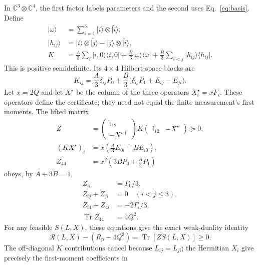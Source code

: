 \documentclass[aps,pra,reprint,amsmath,amssymb,nofootinbib,longbibliography,floatfix]{revtex4-2}
\newcommand{\ket}[1]{\lvert #1\rangle}
\newcommand{\bra}[1]{\langle #1\rvert}
\newcommand{\Tr}{\operatorname{Tr}}
\newcommand{\I}{\mathbb{I}}
\begin{document}
In $\mathbb C^3\otimes\mathbb C^4$, the first factor labels parameters
and the second uses Eq.~\eqref{eq:basis}. Define
\begin{align}
 \ket{\omega}&=\sum_{i=1}^3\ket i\otimes\ket{\widetilde i},\nonumber\\
 \ket{h_{ij}}&=\ket i\otimes\ket{\widetilde j}
                   -\ket j\otimes\ket{\widetilde i},\nonumber\\
 K&=\frac A3\sum_i\ket{i,0}\bra{i,0}
       +\frac B3\ket\omega\bra\omega
       +\frac B3\sum_{i<j}\ket{h_{ij}}\bra{h_{ij}}.
 \label{eq:Kgram}
\end{align}
This is positive semidefinite. Its $4\times4$ Hilbert-space blocks are
\begin{equation}
 K_{ij}=\frac A3\delta_{ij}P_0+
        \frac B3\bigl(\delta_{ij}P_1+E_{ij}-E_{ji}\bigr).
 \label{eq:Kblocks}
\end{equation}
Let $x=2Q$ and let $X^\star$ be the column of the three operators
$X_i^\star=xF_i$. These operators define the certificate; they need
not equal the finite measurement's first moments. The lifted matrix
\begin{align}
 Z&=\begin{pmatrix}\I_{12}\\-X^{\star\dagger}\end{pmatrix}
       K\begin{pmatrix}\I_{12}&-X^\star\end{pmatrix}\succeq0,
       \label{eq:Z}\\
 (KX^\star)_i&=x\left(\frac A3E_{0i}+BE_{i0}\right),\nonumber\\
 Z_{44}&=x^2\left(3BP_0+\frac A3P_1\right)\label{eq:Z44}
\end{align}
obeys, by $A+3B=1$,
\begin{align}
 Z_{ii}&=\Gamma_0/3,\nonumber\\
 Z_{ij}+Z_{ji}&=0\quad(i<j\leq3),\nonumber\\
 Z_{i4}+Z_{4i}&=-2\Gamma_i/3,\nonumber\\
 \Tr Z_{44}&=4Q^2.\label{eq:dualaffine}
\end{align}
For any feasible $S(L,X)$, these equations give the exact weak-duality
identity
\begin{equation}
 \mathcal R(L,X)-(R_{\mathrm p}-4Q^2)
             =\Tr[ZS(L,X)]\geq0.
 \label{eq:weakdual}
\end{equation}
The off-diagonal $K$ contributions cancel because $L_{ij}=L_{ji}$;
the Hermitian $X_i$ give precisely the first-moment coefficients in
\end{document}
